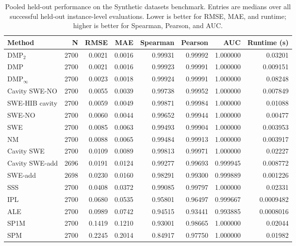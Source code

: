 \begin{table}[t]
\caption{Pooled held-out performance on the Synthetic datasets benchmark. Entries are medians over all successful held-out instance-level evaluations. Lower is better for RMSE, MAE, and runtime; higher is better for Spearman, Pearson, and AUC.}
\label{tab:synthetic-pooled-metrics}
\begin{tabular}{lrrrrrrr}
\toprule
Method & N & RMSE & MAE & Spearman & Pearson & AUC & Runtime (s) \\
\midrule
DMP$_2$ & 2700 & 0.0021 & 0.0016 & 0.99931 & 0.99992 & 1.000000 & 0.03201 \\
DMP & 2700 & 0.0021 & 0.0016 & 0.99923 & 0.99991 & 1.000000 & 0.009151 \\
DMP$_{\infty}$ & 2700 & 0.0023 & 0.0018 & 0.99924 & 0.99991 & 1.000000 & 0.08248 \\
Cavity SWE-NO & 2700 & 0.0055 & 0.0039 & 0.99738 & 0.99952 & 1.000000 & 0.007849 \\
SWE-HIB cavity & 2700 & 0.0059 & 0.0049 & 0.99871 & 0.99984 & 1.000000 & 0.01088 \\
SWE-NO & 2700 & 0.0060 & 0.0044 & 0.99652 & 0.99944 & 1.000000 & 0.00477 \\
SWE & 2700 & 0.0085 & 0.0063 & 0.99493 & 0.99904 & 1.000000 & 0.003953 \\
NM & 2700 & 0.0088 & 0.0065 & 0.99484 & 0.99913 & 1.000000 & 0.003917 \\
Cavity SWE & 2700 & 0.0109 & 0.0089 & 0.99813 & 0.99971 & 1.000000 & 0.02227 \\
Cavity SWE-add & 2696 & 0.0191 & 0.0124 & 0.99277 & 0.99693 & 0.999945 & 0.008772 \\
SWE-add & 2698 & 0.0230 & 0.0160 & 0.98291 & 0.99300 & 0.999889 & 0.001226 \\
SSS & 2700 & 0.0408 & 0.0372 & 0.99085 & 0.99797 & 1.000000 & 0.02331 \\
IPL & 2700 & 0.0680 & 0.0535 & 0.95801 & 0.96497 & 0.999667 & 0.0009482 \\
ALE & 2700 & 0.0989 & 0.0742 & 0.94515 & 0.93441 & 0.993885 & 0.0008016 \\
SP1M & 2700 & 0.1419 & 0.1210 & 0.93001 & 0.98665 & 1.000000 & 0.02044 \\
SPM & 2700 & 0.2245 & 0.2014 & 0.84917 & 0.97750 & 1.000000 & 0.01982 \\
\bottomrule
\end{tabular}
\end{table}
